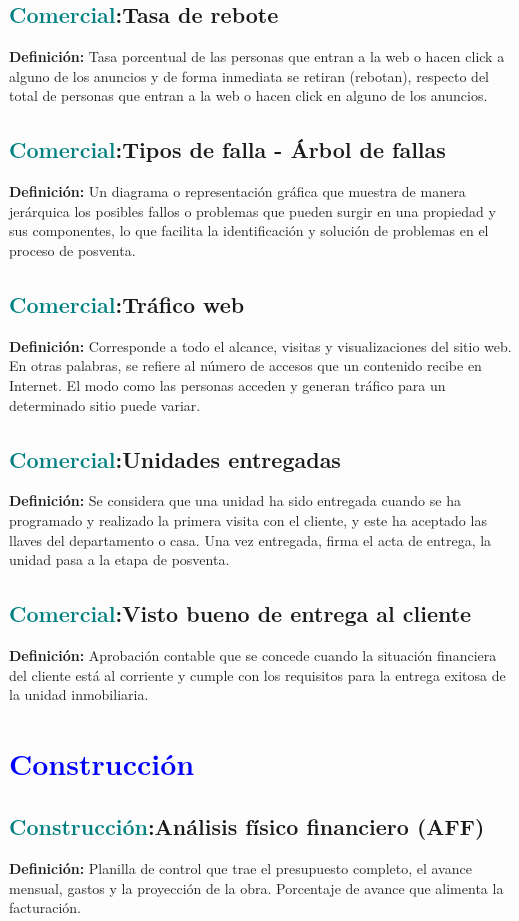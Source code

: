 \documentclass[12pt]{article}
\begin{document}
\subsection{\textcolor{teal}{Comercial}:{Tasa de rebote}}
\textbf{Definición:} Tasa porcentual de las personas que entran a la web o hacen click a alguno de los anuncios y de forma inmediata se retiran (rebotan), respecto del total de personas que entran a la web o hacen click en alguno de los anuncios.
\subsection{\textcolor{teal}{Comercial}:{Tipos de falla - Árbol de fallas}}
\textbf{Definición:} Un diagrama o representación gráfica que muestra de manera jerárquica los posibles fallos o problemas que pueden surgir en una propiedad y sus componentes, lo que facilita la identificación y solución de problemas en el proceso de posventa.
\subsection{\textcolor{teal}{Comercial}:{Tráfico web}}
\textbf{Definición:} Corresponde a todo el alcance, visitas y visualizaciones del sitio web. En otras palabras, se refiere al número de accesos que un contenido recibe en Internet. El modo como las personas acceden y generan tráfico para un determinado sitio puede variar.
\subsection{\textcolor{teal}{Comercial}:{Unidades entregadas}}
\textbf{Definición:} Se considera que una unidad ha sido entregada cuando se ha programado y realizado la primera visita con el cliente, y este ha aceptado las llaves del departamento o casa. Una vez entregada, firma el acta de entrega, la unidad pasa a la etapa de posventa.
\subsection{\textcolor{teal}{Comercial}:{Visto bueno de entrega al cliente}}
\textbf{Definición:} Aprobación contable que se concede cuando la situación financiera del cliente está al corriente y cumple con los requisitos para la entrega exitosa de la unidad inmobiliaria.
\section{\textcolor{blue}{Construcción}}
\subsection{\textcolor{teal}{Construcción}:{Análisis físico financiero (AFF)}}
\textbf{Definición:} Planilla de control que trae el presupuesto completo, el avance mensual, gastos y la proyección de la obra. Porcentaje de avance que alimenta la facturación.
\end{document}
